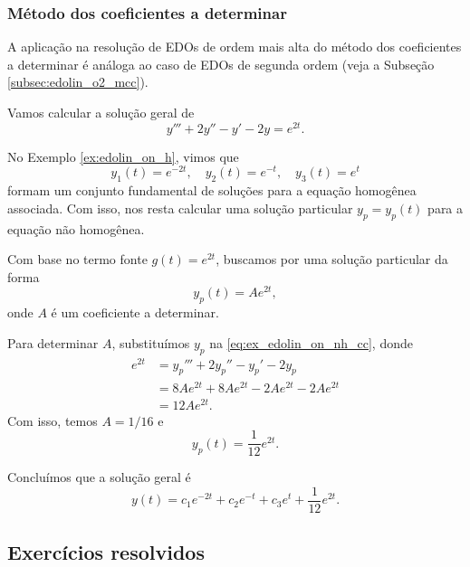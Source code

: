 \subsubsection{Método dos coeficientes a determinar}

A aplicação na resolução de EDOs de ordem mais alta do método dos coeficientes a determinar é análoga ao caso de EDOs de segunda ordem (veja a Subseção \ref{subsec:edolin_o2_mcc}).

\begin{ex}
  Vamos calcular a solução geral de
  \begin{equation}\label{eq:ex_edolin_on_nh_cc}
    y''' + 2y'' - y' - 2y = e^{2t}.
  \end{equation}

  No Exemplo \ref{ex:edolin_on_h}, vimos que
  \begin{equation}
    y_1(t) = e^{-2t},\quad y_2(t)=e^{-t},\quad y_3(t)=e^t
  \end{equation}
  formam um conjunto fundamental de soluções para a equação homogênea associada. Com isso, nos resta calcular uma solução particular $y_p=y_p(t)$ para a equação não homogênea.

  Com base no termo fonte $g(t) = e^{2t}$, buscamos por uma solução particular da forma
  \begin{equation}
    y_p(t) = Ae^{2t},
  \end{equation}
  onde $A$ é um coeficiente a determinar.

  Para determinar $A$, substituímos $y_p$ na \eqref{eq:ex_edolin_on_nh_cc}, donde
  \begin{align}
    e^{2t} &= y_p''' + 2y_p'' - y_p' - 2y_p \\
           &= 8Ae^{2t}+8Ae^{2t}-2Ae^{2t}-2Ae^{2t} \\
           &= 12Ae^{2t}.
  \end{align}
  Com isso, temos $A = 1/16$ e
  \begin{equation}
    y_p(t) = \frac{1}{12}e^{2t}.
  \end{equation}

  Concluímos que a solução geral é
  \begin{equation}
    y(t) = c_1e^{-2t} + c_2e^{-t} + c_3e^t + \frac{1}{12}e^{2t}.
  \end{equation}
\end{ex}


\subsection*{Exercícios resolvidos}

